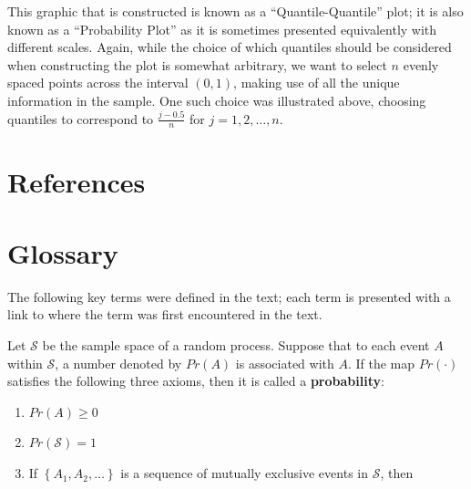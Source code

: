 \documentclass[
  letterpaper,
  DIV=11,
  numbers=noendperiod]{scrreprt}
\providecommand{\tightlist}{%
  \setlength{\itemsep}{0pt}\setlength{\parskip}{0pt}}\usepackage{longtable,booktabs,array}
\newlength{\cslhangindent}
\newlength{\cslentryspacingunit} %
\newenvironment{CSLReferences}[2] %
 {%
  \setlength{\parindent}{0pt}
  \ifodd #1
  \let\oldpar\par
  \def\par{\hangindent=\cslhangindent\oldpar}
  \fi
  \setlength{\parskip}{#2\cslentryspacingunit}
 }%
 {}
\theoremstyle{plain}
\theoremstyle{definition}
\theoremstyle{definition}
\theoremstyle{remark}
\begin{document}
This graphic that is constructed is known as a ``Quantile-Quantile''
plot; it is also known as a ``Probability Plot'' as it is sometimes
presented equivalently with different scales. Again, while the choice of
which quantiles should be considered when constructing the plot is
somewhat arbitrary, we want to select \(n\) evenly spaced points across
the interval \((0, 1)\), making use of all the unique information in the
sample. One such choice was illustrated above, choosing quantiles to
correspond to \(\frac{j - 0.5}{n}\) for \(j = 1,2,\dotsc,n\).


\hypertarget{references}{%
\chapter*{References}\label{references}}


\hypertarget{refs}{}
\begin{CSLReferences}{0}{0}
\end{CSLReferences}

\cleardoublepage
{}
{}
\appendix

\hypertarget{glossary}{%
\chapter{Glossary}\label{glossary}}

The following key terms were defined in the text; each term is presented
with a link to where the term was first encountered in the text.

\begin{description}
\tightlist
\item[Axioms of Probability (Definition~\ref{def-axioms})]
Let \(\mathcal{S}\) be the sample space of a random process. Suppose
that to each event \(A\) within \(\mathcal{S}\), a number denoted by
\(Pr(A)\) is associated with \(A\). If the map \(Pr(\cdot)\) satisfies
the following three axioms, then it is called a \textbf{probability}:
\end{description}

\begin{enumerate}
\def\labelenumi{\arabic{enumi}.}
\tightlist
\item
  \(Pr(A) \geq 0\)
\item
  \(Pr(\mathcal{S}) = 1\)
\item
  If \(\left\{A_1, A_2, \dotsc\right\}\) is a sequence of mutually
  exclusive events in \(\mathcal{S}\), then
\end{enumerate}
\end{document}
